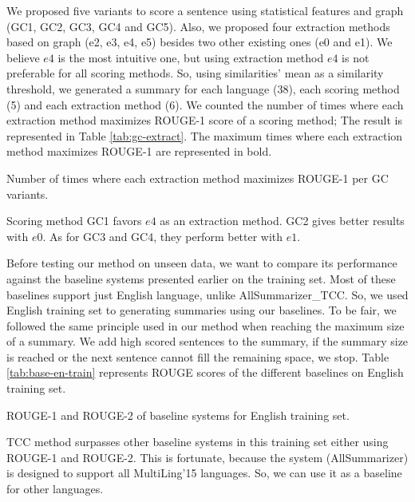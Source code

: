 We proposed five variants to score a sentence using statistical features and graph (GC1, GC2, GC3, GC4 and GC5). 
Also, we proposed four extraction methods based on graph (e2, e3, e4, e5) besides two other existing ones (e0 and e1).
We believe $ e4 $ is the most intuitive one, but using extraction method $ e4 $ is not preferable for all scoring methods. 
So, using similarities' mean as a similarity threshold, we generated a summary for each language (38), each scoring method (5) and each extraction method (6).
We counted the number of times where each extraction method maximizes ROUGE-1 score of a scoring method; The result is represented in Table \ref{tab:gc-extract}.
The maximum times where each extraction method maximizes ROUGE-1 are represented in bold. 

\begin{table}[ht]
	\centering
	\caption{Number of times where each extraction method maximizes ROUGE-1 per GC variants.}
	\label{tab:gc-extract}
\end{table}

Scoring method GC1 favors $ e4 $ as an extraction method. 
GC2 gives better results with $ e0 $.
As for GC3 and GC4, they perform better with $ e1 $.


Before testing our method on unseen data, we want to compare its performance against the baseline systems presented earlier on the training set. 
Most of these baselines support just English language, unlike AllSummarizer\_TCC. 
So, we used English training set to generating summaries using our baselines. 
To be fair, we followed the same principle used in our method when reaching the maximum size of a summary. 
We add high scored sentences to the summary, if the summary size is reached or the next sentence cannot fill the remaining space, we stop. 
Table \ref{tab:base-en-train} represents ROUGE scores of the different baselines on English training set.
\begin{table}[ht]
		\caption{ROUGE-1 and ROUGE-2 of baseline systems for English training set.}
		\label{tab:base-en-train}
\end{table}
TCC method surpasses other baseline systems in this training set either using ROUGE-1 and ROUGE-2.
This is fortunate, because the system (AllSummarizer) is designed to support all MultiLing'15 languages.
So, we can use it as a baseline for other languages.


